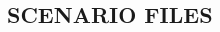 \documentclass[Space_Shuttle_Ultra_Manual.tex]{subfiles}
\begin{document}
\begin{multicols}{2}
\section{SCENARIO FILES}
\label{sec:scenario-files}

\end{multicols}
\end{document}

